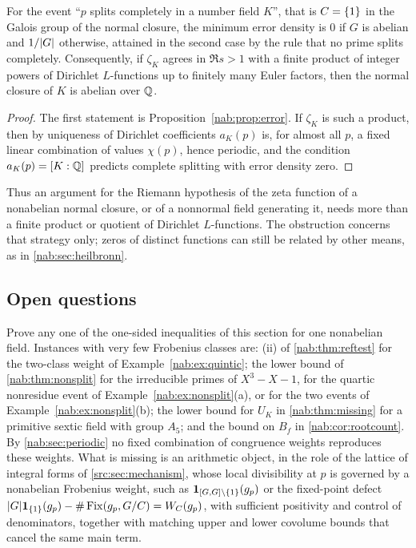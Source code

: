 \begin{corollary}[\stU]\label{nab:cor:dirichletproduct}
For the event ``$p$ splits completely in a number field $K$'', that is $C=\{1\}$ in the
Galois group of the normal closure, the minimum error density is $0$ if $G$ is abelian and
$1/\lvert G\rvert$ otherwise, attained in the second case by the rule that no prime splits
completely. Consequently, if $\zeta_K$ agrees in $\Re s>1$ with a finite product of integer
powers of Dirichlet $L$-functions up to finitely many Euler factors, then the normal
closure of $K$ is abelian over $\mathbb{Q}$.
\end{corollary}
\begin{proof}
The first statement is Proposition~\ref{nab:prop:error}. If $\zeta_K$ is such a product, then by
uniqueness of Dirichlet coefficients $a_K(p)$ is, for almost all $p$, a fixed linear
combination of values $\chi(p)$, hence periodic, and the condition $a_K(p)=[K:\mathbb{Q}]$ predicts
complete splitting with error density zero.
\end{proof}

Thus an argument for the Riemann hypothesis of the zeta function of a nonabelian normal
closure, or of a nonnormal field generating it, needs more than a finite product or
quotient of Dirichlet $L$-functions. The obstruction concerns that strategy only; zeros of
distinct functions can still be related by other means, as in
\cref{nab:sec:heilbronn}.

\subsection{Open questions}\label{nab:sec:open}

\begin{question}\label{nab:q:arithmetic}
Prove any one of the one-sided inequalities of this section for one nonabelian field.
Instances with very few Frobenius classes are: \textup{(ii)} of \cref{nab:thm:reftest} for
the two-class weight of Example~\ref{nab:ex:quintic}; the lower bound of
\cref{nab:thm:nonsplit} for the irreducible primes of $X^3-X-1$, for the quartic
nonresidue event of Example~\ref{nab:ex:nonsplit}\textup{(a)}, or for the two events of
Example~\ref{nab:ex:nonsplit}\textup{(b)}; the lower bound for $U_K$ in
\cref{nab:thm:missing} for a primitive sextic field with group $A_5$; and the bound on
$B_f$ in \cref{nab:cor:rootcount}. By \cref{nab:sec:periodic} no fixed combination
of congruence weights reproduces these weights. What is missing is an arithmetic object,
in the role of the lattice of integral forms of \cref{src:sec:mechanism}, whose local
divisibility at $p$ is governed by a nonabelian Frobenius weight, such as
$\mathbf{1}_{[G,G]\setminus\{1\}}(g_p)$ or the fixed-point defect
$\lvert G\rvert\mathbf{1}_{\{1\}}(g_p)-\#\operatorname{Fix}(g_p,G/C)=W_C(g_p)$, with sufficient positivity and
control of denominators, together with matching upper and lower covolume bounds that
cancel the same main term.
\end{question}

